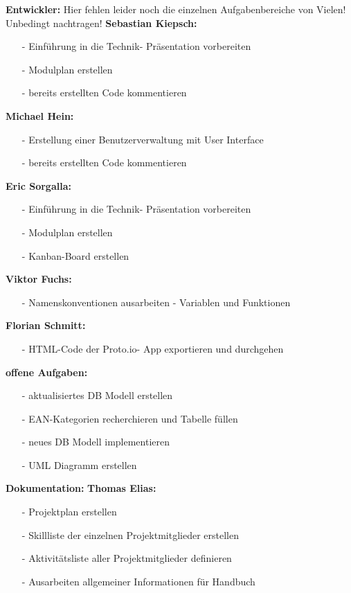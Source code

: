 \documentclass[12pt,a4paper]{article}
\begin{document}
\textbf{Entwickler:}
Hier fehlen leider noch die einzelnen Aufgabenbereiche von Vielen!  Unbedingt nachtragen!
\newline
\textbf{Sebastian Kiepsch:}
\begin{itemize}
\item[-] Einführung in die Technik- Präsentation vorbereiten
\item[-]Modulplan erstellen
\item[-] bereits erstellten Code kommentieren
\end{itemize}
\textbf{Michael Hein:}
\begin{itemize}
\item[-]Erstellung einer Benutzerverwaltung mit User Interface
\item[-] bereits erstellten Code kommentieren
\end{itemize}
\textbf{Eric Sorgalla:}
\begin{itemize}
\item[-] Einführung in die Technik- Präsentation vorbereiten
\item[-] Modulplan erstellen
\item[-] Kanban-Board erstellen
\end{itemize}
\textbf{Viktor Fuchs:}
\begin{itemize}
\item[-] Namenskonventionen ausarbeiten - Variablen und Funktionen
\end{itemize}
\textbf{Florian Schmitt:}
\begin{itemize}
\item[-] HTML-Code der Proto.io- App exportieren und durchgehen
\end{itemize}
\textbf{offene Aufgaben:}
\begin{itemize}
\item[-] aktualisiertes DB Modell erstellen
\item[-] EAN-Kategorien recherchieren und Tabelle füllen
\item[-] neues DB Modell implementieren
\item[-] UML Diagramm erstellen
\end{itemize}

\newpage
\textbf {Dokumentation:}
\newline
\textbf{Thomas Elias:}
\begin{itemize}
\item[-] Projektplan erstellen 
\item[-] Skillliste der einzelnen Projektmitglieder erstellen
\item[-] Aktivitätsliste aller Projektmitglieder definieren
\item[-] Ausarbeiten allgemeiner Informationen für Handbuch
\end{itemize}
\end{document}
